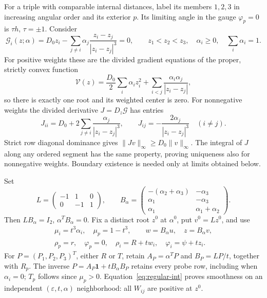 \documentclass[11pt,a4paper]{article}
\numberwithin{equation}{section}
\theoremstyle{remark}
\newcommand{\eps}{\varepsilon}
\newcommand{\one}{\boldsymbol{1}}
\newcommand{\norm}[1]{\lVert#1\rVert}
\begin{document}
For a triple with comparable internal distances, label its members $1,2,3$ in increasing angular order and its exterior $p$. Its limiting angle in the gauge $\varphi_p=0$ is $\tau h$, $\tau=\pm1$. Consider
\begin{equation}\label{eq:internal}
 \mathcal G_i(z;\alpha)=D_0z_i-
 \sum_{j\ne i}\alpha_j\frac{z_i-z_j}{|z_i-z_j|^3}=0,
 \qquad z_1<z_2<z_3,\quad \alpha_i\ge0,\quad\sum_i\alpha_i=1.
\end{equation}
For positive weights these are the divided gradient equations of the proper, strictly convex function
\[
 \mathcal V(z)=\frac{D_0}2\sum_i\alpha_i z_i^2+
 \sum_{i<j}\frac{\alpha_i\alpha_j}{|z_i-z_j|},
\]
so there is exactly one root and its weighted center is zero. For nonnegative weights the divided derivative $J=D_z\mathcal G$ has entries
\begin{equation}\label{eq:internal-J}
 J_{ii}=D_0+2\sum_{j\ne i}\frac{\alpha_j}{|z_i-z_j|^3},\qquad
 J_{ij}=-\frac{2\alpha_j}{|z_i-z_j|^3}\quad(i\ne j).
\end{equation}
Strict row diagonal dominance gives $\norm{Jv}_\infty\ge D_0\norm v_\infty$. The integral of $J$ along any ordered segment has the same property, proving uniqueness also for nonnegative weights. Boundary existence is needed only at limits obtained below.

Set
\begin{equation}\label{eq:LB}
 L=\begin{pmatrix}-1&1&0\\0&-1&1\end{pmatrix},\qquad
 B_\alpha=\begin{pmatrix}-(\alpha_2+\alpha_3)&-\alpha_3\\
 \alpha_1&-\alpha_3\\\alpha_1&\alpha_1+\alpha_2\end{pmatrix}.
\end{equation}
Then $LB_\alpha=I_2$, $\alpha^TB_\alpha=0$. Fix a distinct root $z^0$ at $\alpha^0$, put $v^0=Lz^0$, and use
\begin{equation}\label{eq:regular-coordinates}
 \begin{gathered}
 \mu_i=t^3\alpha_i,\quad\mu_p=1-t^3,\qquad
 w=B_\alpha u,\quad z=B_\alpha v,\\
 \rho_p=r,\quad\varphi_p=0,\quad
 \rho_i=R+tw_i,\quad\varphi_i=\psi+tz_i.
 \end{gathered}
\end{equation}
For $P=(P_1,P_2,P_3)^T$, either $R$ or $T$, retain $A_P=\alpha^TP$ and $B_P=LP/t$, together with $R_p$. The inverse $P=A_P\one+tB_\alpha B_P$ retains every probe row, including when $\alpha_i=0$; $T_p$ follows since $\mu_p>0$. Equation~\eqref{eq:regular-int} proves smoothness on an independent $(\eps,t,\alpha)$ neighborhood: all $W_{ij}$ are positive at $z^0$.
\end{document}
